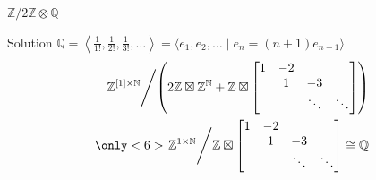 \documentclass{beamer}
\begin{document}
\begin{frame}
    $\mathbb{Z}/2\mathbb{Z}\otimes \mathbb{Q}$

    \begin{block}{Solution}
    $\mathbb{Q}=\left\langle \frac{1}{1!},\frac{1}{2!},\frac{1}{3!},\ldots\right\rangle =\langle e_1,e_2,\ldots \mid e_n=(n+1)e_{n+1}\rangle$
    \begin{align*}
        \left.
        \mathbb{Z}^{[1]\times \mathbb{N}}
        \middle/
        \left(2\mathbb{Z}\boxtimes \mathbb{Z}^{\mathbb{N}}
        +\mathbb{Z}\boxtimes \begin{bmatrix} 1 & -2 & & \\  & 1 & -3 & \\  & & \ddots & \ddots \end{bmatrix} 
        \right)
        \right.\\
        \only<6>{
            \left.
            \mathbb{Z}^{1\times \mathbb{N}}\middle/\mathbb{Z}\boxtimes \begin{bmatrix} 1 & -2 & & \\  & 1 & -3 & \\  & & \ddots & \ddots \end{bmatrix}
            \cong \mathbb{Q}
            \right.
        }
    \end{align*}
\end{block}
\end{frame}
\end{document}
